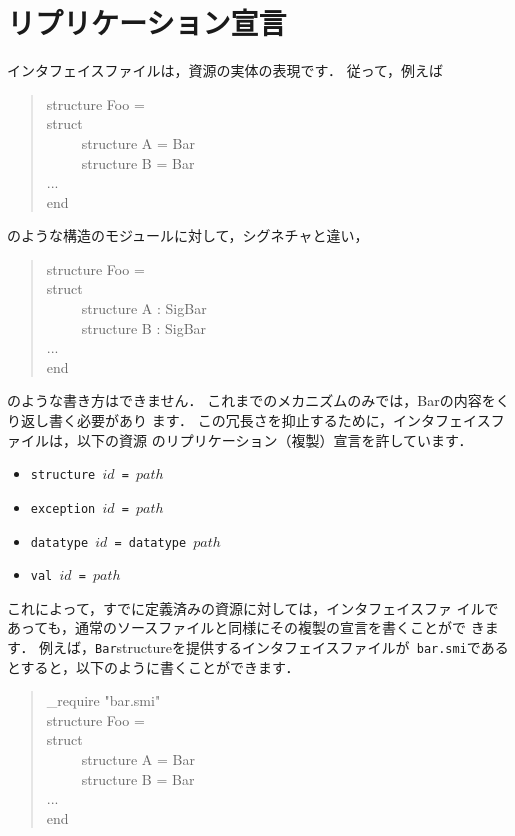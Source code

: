 \documentclass{jbook}
\newenvironment{program}{\begin{tt}\begin{quote}}{\end{quote}\end{tt}}
\newcommand{\myem}{\ \ \ \ \  }
\begin{document}
\section{リプリケーション宣言}
\label{sec:tutorialReplicationInInterface}

	インタフェイスファイルは，資源の実体の表現です．
	従って，例えば
\begin{program}
structure Foo = \\
struct\\
\myem structure A = Bar\\
\myem structure B = Bar\\
...\\
end

\end{program}
のような構造のモジュールに対して，シグネチャと違い，
\begin{program}
structure Foo = \\
struct\\
\myem structure A : SigBar\\
\myem structure B : SigBar\\
...\\
end
\end{program}
のような書き方はできません．
	これまでのメカニズムのみでは，Barの内容をくり返し書く必要があり
ます．
	この冗長さを抑止するために，インタフェイスファイルは，以下の資源
のリプリケーション（複製）宣言を許しています．
\begin{itemize}
\item {\tt structure $id$ =  $path$}
\item {\tt exception $id$ = $path$}
\item {\tt datatype $id$ = datatype $path$}
\item {\tt val $id$ = $path$}
\end{itemize}
	これによって，すでに定義済みの資源に対しては，インタフェイスファ
イルであっても，通常のソースファイルと同様にその複製の宣言を書くことがで
きます．
	例えば，{\tt Bar}structureを提供するインタフェイスファイルが{\tt
bar.smi}であるとすると，以下のように書くことができます．
\begin{program}
\_require "bar.smi"\\
structure Foo = \\
struct\\
\myem structure A = Bar\\
\myem structure B = Bar\\
...\\
end
\end{program}
\end{document}
